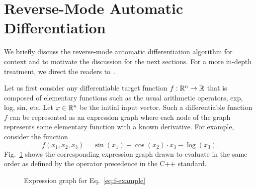 \section{Reverse-Mode Automatic Differentiation}

We briefly discuss the reverse-mode automatic differentiation algorithm
for context and to motivate the discussion for the next sections.
For a more in-depth treatment, we direct the readers 
to~\cite{carpenter:2015}\cite{margossian:2018}\cite{griewank:2008}.

Let us first consider any differentiable target function $f: \mathbb{R}^n \to \mathbb{R}$
that is composed of elementary functions such as the usual arithmetic operators,
exp, log, sin, etc.
Let $x \in \mathbb{R}^n$ be the initial input vector.
Such a differentiable function $f$ can be represented as an expression graph
where each node of the graph represents some elementary function with a known derivative.
For example, consider the function 
\begin{equation}
    f(x_1, x_2, x_3) = \sin(x_1) + \cos(x_2) \cdot x_3 - \log(x_3)
    \label{eq:f-example}
\end{equation}
Fig.~\ref{fig:expr-example} shows the corresponding expression graph
drawn to evaluate in the same order as defined by the operator precedence in the C++ standard.

\begin{figure}[t]
\centering
{}

\caption{Expression graph for Eq.~\ref{eq:f-example}}\label{fig:expr-example}

\end{figure}

